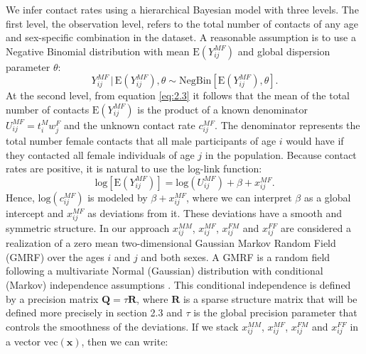 \documentclass[aoas,preprint]{imsart}
\numberwithin{equation}{section}
\begin{document}
We infer contact rates using a hierarchical Bayesian model with three levels. The first level, the observation level, refers to the total number of contacts of any age and sex-specific combination in the dataset. A reasonable assumption is to use a Negative Binomial distribution \citep{wallinga_using_2006, mossong_social_2008, goeyvaerts_estimating_2010} with mean $\text{E}(Y_\mathit{ij}^\mathit{MF})$ and global dispersion parameter $\theta$:
\begin{equation}\label{eq:2.4}
Y_\mathit{ij}^\mathit{MF} \, | \, \text{E}(Y_\mathit{ij}^\mathit{MF}), \theta \sim \text{NegBin}[\text{E}(Y_\mathit{ij}^\mathit{MF}), \theta].
\end{equation}
At the second level, from equation \ref{eq:2.3} it follows that the mean of the total number of contacts $\text{E}(Y_\mathit{ij}^\mathit{MF})$ is the product of a known denominator $U_\mathit{ij}^\mathit{MF} = t_i^M w_j^F$ and the unknown contact rate $c_\mathit{ij}^\mathit{MF}$. The denominator represents the total number female contacts that all male participants of age $i$ would have if they contacted all female individuals of age $j$ in the population. Because contact rates are positive, it is natural to use the log-link function:
\begin{equation}\label{eq:2.5}
\text{log}[\text{E}(Y_\mathit{ij}^\mathit{MF})] = \text{log}(U_\mathit{ij}^\mathit{MF}) + \beta + x_\mathit{ij}^\mathit{MF}.
\end{equation}
Hence, $\text{log}(c_\mathit{ij}^\mathit{MF})$ is modeled by $\beta + x_\mathit{ij}^\mathit{MF}$, where we can interpret $\beta$ as a global intercept and $x_\mathit{ij}^\mathit{MF}$ as deviations from it. These deviations have a smooth and symmetric structure. In our approach $x_\mathit{ij}^\mathit{MM}$, $x_\mathit{ij}^\mathit{MF}$, $x_\mathit{ij}^\mathit{FM}$ and $x_\mathit{ij}^\mathit{FF}$ are considered a realization of a zero mean two-dimensional Gaussian Markov Random Field (GMRF) over the ages $i$ and $j$ and both sexes. A GMRF is a random field following a multivariate Normal (Gaussian) distribution with conditional (Markov) independence assumptions \citep{rue_gaussian_2005}. This conditional independence is defined by a precision matrix $\bm{Q} = \tau\bm{R}$, where $\bm{R}$ is a sparse structure matrix that will be defined more precisely in section 2.3 and $\tau$ is the global precision parameter that controls the smoothness of the deviations. If we stack $x_\mathit{ij}^\mathit{MM}$, $x_\mathit{ij}^\mathit{MF}$, $x_\mathit{ij}^\mathit{FM}$ and $x_\mathit{ij}^\mathit{FF}$ in a vector $\text{vec}(\bm{x})$, then we can write:
\end{document}
